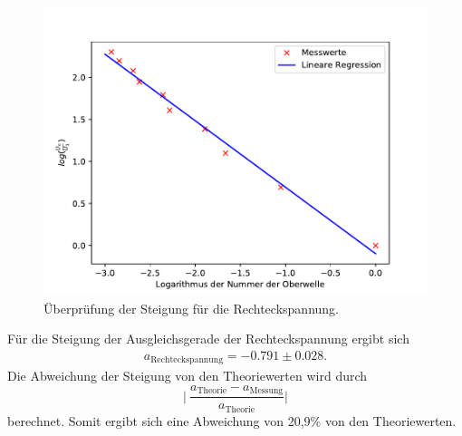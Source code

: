 \begin{figure}[H]
  \centering
  \includegraphics{plot1.pdf}
  \caption{Überprüfung der Steigung für die Rechteckspannung.}
  \label{fig:plot1}
\end{figure}
Für die Steigung der Ausgleichsgerade der Rechteckspannung ergibt sich
\begin{align*}
 a_{\text{Rechteckspannung}}= -0.791 \pm 0.028.
\end{align*}
Die Abweichung der Steigung von den Theoriewerten wird durch
\begin{equation}
  \lvert \: \frac{a_{\text{Theorie}}-a_{\text{Messung}}}{a_{\text{Theorie}}} \rvert
  \label{eqn:abw}
\end{equation}
berechnet.
Somit ergibt sich eine Abweichung von 20,9\% von den Theoriewerten.

